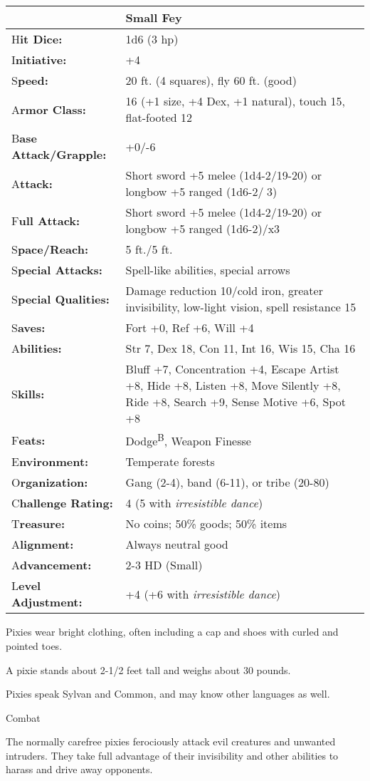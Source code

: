 \documentclass{article}
\begin{document}
\begin{tabular}{|>{\raggedright}p{91pt}|>{\raggedright}p{235pt}|}
\hline
  & Small Fey\tabularnewline
\hline
H\textbf{it Dice:} & 1d6 (3 hp)\tabularnewline
\hline
I\textbf{nitiative:} & +4\tabularnewline
\hline
S\textbf{peed:} & 20 ft. (4 squares), fly 60 ft. (good)\tabularnewline
\hline
A\textbf{rmor Class:} & 16 (+1 size, +4 Dex, +1 natural), touch 15, flat-footed 
12\tabularnewline
\hline
B\textbf{ase Attack/Grapple:} & +0/-6\tabularnewline
\hline
A\textbf{ttack:} & Short sword +5 melee (1d4-2/19-20) or longbow +5 ranged (1d6-2/3)\tabularnewline
\hline
F\textbf{ull Attack:} & Short sword +5 melee (1d4-2/19-20) or longbow +5 ranged 
(1d6-2)/x3\tabularnewline
\hline
S\textbf{pace/Reach:} & 5 ft./5 ft.\tabularnewline
\hline
S\textbf{pecial Attacks:} & Spell-like abilities, special arrows \tabularnewline
\hline
S\textbf{pecial Qualities:} & Damage reduction 10/cold iron, greater invisibility, 
low-light vision, spell resistance 15\tabularnewline
\hline
S\textbf{aves:} & Fort +0, Ref +6, Will +4\tabularnewline
\hline
A\textbf{bilities:} & Str 7, Dex 18, Con 11, Int 16, Wis 15, Cha 16\tabularnewline
\hline
S\textbf{kills:} & Bluff +7, Concentration +4, Escape Artist +8, Hide +8, Listen 
+8, Move Silently +8, Ride +8, Search +9, Sense Motive +6, Spot +8\tabularnewline
\hline
F\textbf{eats:} & Dodge\textsuperscript{B}, Weapon Finesse\tabularnewline
\hline
E\textbf{nvironment:} & Temperate forests\tabularnewline
\hline
O\textbf{rganization:} & Gang (2-4), band (6-11), or tribe (20-80)\tabularnewline
\hline
C\textbf{hallenge Rating:} & 4 (5 with \textit{irresistible dance})\tabularnewline
\hline
T\textbf{reasure:} & No coins; 50\% goods; 50\% items\tabularnewline
\hline
A\textbf{lignment:} & Always neutral good\tabularnewline
\hline
A\textbf{dvancement:} & 2-3 HD (Small)\tabularnewline
\hline
L\textbf{evel Adjustment:} & +4 (+6 with \textit{irresistible dance})\tabularnewline
\hline
\end{tabular}

Pixies wear bright clothing, often including a cap and shoes with curled and pointed 
toes.

A pixie stands about 2-1/2 feet tall and weighs about 30 pounds.

Pixies speak Sylvan and Common, and may know other languages as well.

Combat

The normally carefree pixies ferociously attack evil creatures and unwanted intruders. 
They take full advantage of their invisibility and other abilities to harass and 
drive away opponents.
\end{document}
